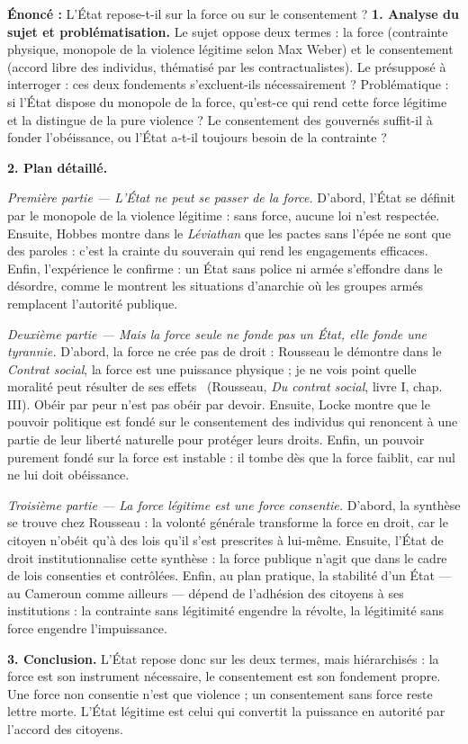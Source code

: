 \documentclass[11pt]{article}
\newcommand{\cle}[1]{{\popxbold\color{popdark}#1}}
\begin{document}
\begin{exoresolu}
\textbf{Énoncé :} L'État repose-t-il sur la force ou sur le consentement ?
\tcblower
\textbf{1. Analyse du sujet et problématisation.} Le sujet oppose deux termes : la \cle{force} (contrainte physique, monopole de la violence légitime selon Max Weber) et le \cle{consentement} (accord libre des individus, thématisé par les contractualistes). Le présupposé à interroger : ces deux fondements s'excluent-ils nécessairement ? Problématique : si l'État dispose du monopole de la force, qu'est-ce qui rend cette force légitime et la distingue de la pure violence ? Le consentement des gouvernés suffit-il à fonder l'obéissance, ou l'État a-t-il toujours besoin de la contrainte ?

\textbf{2. Plan détaillé.}

\emph{Première partie — L'État ne peut se passer de la force.} D'abord, l'État se définit par le monopole de la violence légitime : sans force, aucune loi n'est respectée. Ensuite, Hobbes montre dans le \emph{Léviathan} que les pactes sans l'épée ne sont que des paroles : c'est la crainte du souverain qui rend les engagements efficaces. Enfin, l'expérience le confirme : un État sans police ni armée s'effondre dans le désordre, comme le montrent les situations d'anarchie où les groupes armés remplacent l'autorité publique.

\emph{Deuxième partie — Mais la force seule ne fonde pas un État, elle fonde une tyrannie.} D'abord, la force ne crée pas de droit : Rousseau le démontre dans le \emph{Contrat social}, \guillemotleft la force est une puissance physique ; je ne vois point quelle moralité peut résulter de ses effets \guillemotright\ (Rousseau, \emph{Du contrat social}, livre I, chap. III). Obéir par peur n'est pas obéir par devoir. Ensuite, Locke montre que le pouvoir politique est fondé sur le consentement des individus qui renoncent à une partie de leur liberté naturelle pour protéger leurs droits. Enfin, un pouvoir purement fondé sur la force est instable : il tombe dès que la force faiblit, car nul ne lui doit obéissance.

\emph{Troisième partie — La force légitime est une force consentie.} D'abord, la synthèse se trouve chez Rousseau : la \cle{volonté générale} transforme la force en droit, car le citoyen n'obéit qu'à des lois qu'il s'est prescrites à lui-même. Ensuite, l'\cle{État de droit} institutionnalise cette synthèse : la force publique n'agit que dans le cadre de lois consenties et contrôlées. Enfin, au plan pratique, la stabilité d'un État — au Cameroun comme ailleurs — dépend de l'adhésion des citoyens à ses institutions : la contrainte sans légitimité engendre la révolte, la légitimité sans force engendre l'impuissance.

\textbf{3. Conclusion.} L'État repose donc sur les deux termes, mais hiérarchisés : la force est son instrument nécessaire, le consentement est son fondement propre. Une force non consentie n'est que violence ; un consentement sans force reste lettre morte. L'État légitime est celui qui convertit la puissance en autorité par l'accord des citoyens.
\end{exoresolu}
\end{document}
